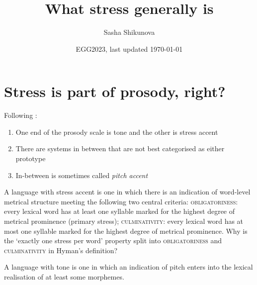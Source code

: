 \documentclass[a4paper, 12pt]{article}
\title{What stress generally is}
\author{Sasha Shikunova}
\date{EGG2023, last updated \today}
\begin{document}
\maketitle


		\section{Stress is part of prosody, right?}
		

	Following \textcite{hyman2006}: 
	
	\begin{enumerate}[$\gg$]
		\item One end of the prosody scale is tone and the other is stress accent
		\item There are systems in between that are not best categorised as either prototype
		\item In-between is sometimes called \emph{pitch accent}
	\end{enumerate}
	
	\pex\label{def:stress}A language with stress accent is one in which there is an indication of word-level metrical structure meeting the following two central criteria:
		\a \textsc{obligatoriness}: every lexical word has at least one syllable marked for the highest degree of metrical prominence (primary stress);
		\a \textsc{culminativity}: every lexical word has at most one syllable marked for the highest degree of metrical prominence. 
	\xe
	Why is the `exactly one stress per word' property split into \textsc{obligatoriness} and \textsc{culminativity} in Hyman's definition?
	
	\ex
		A language with tone is one in which an indication of pitch enters into the lexical realisation of at least some morphemes. 
	\xe
	
\end{document}
